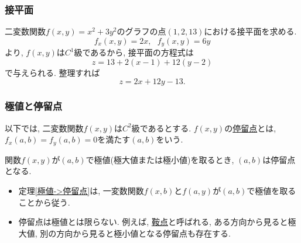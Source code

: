 

\begin{frame}
\frametitle{接平面}

二変数関数$f(x,y)=x^2+3y^2$のグラフの点$(1,2,13)$における接平面を求める. 
$$
f_x(x,y)=2x, \ \ \ f_y(x,y)=6y
$$
より, $f(x,y)$は$C^1$級であるから, 接平面の方程式は
$$
z=13+2(x-1)+12(y-2)
$$
で与えられる. 整理すれば
$$
z=2x+12y-13. 
$$

\end{frame}




\begin{frame}
\frametitle{極値と停留点}

以下では, 二変数関数$f(x,y)$は$C^2$級であるとする. 
$f(x,y)$の\underline{停留点}とは, $f_x(a,b) = f_y(a,b) = 0$を満たす$(a,b)$をいう. 

\begin{Thm} \label{極値->停留点}
関数$f(x,y)$が$(a,b)$で極値(極大値または極小値)を取るとき, $(a,b)$は停留点となる. 
\end{Thm}

\begin{itemize}
\item 定理\ref{極値->停留点}は, 一変数関数$f(x,b)$と$f(a,y)$が$(a,b)$で極値を取ることから従う. 
\item 停留点は極値とは限らない. 例えば, \underline{鞍点}と呼ばれる, ある方向から見ると極大値, 別の方向から見ると極小値となる停留点も存在する. 
\end{itemize}

\end{frame}






